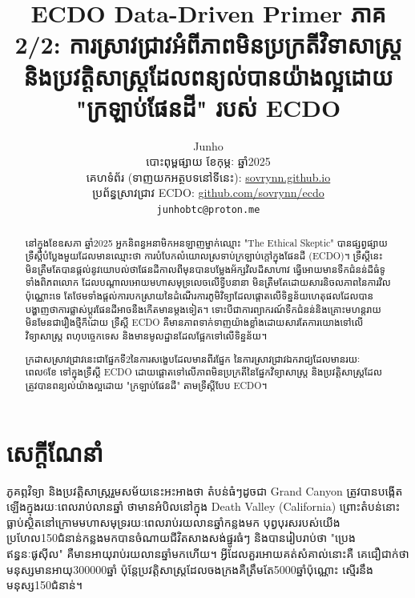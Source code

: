 \documentclass[10pt,twocolumn,letterpaper]{article}
\begin{document}
\title{ECDO Data-Driven Primer ភាគ 2/2: ការស្រាវជ្រាវអំពីភាពមិនប្រក្រតីវិទាសាស្ត្រនិងប្រវត្តិសាស្ត្រដែលពន្យល់បានយ៉ាងល្អដោយ "ក្រឡាប់ផែនដី" របស់  ECDO}

\author{Junho\\
បោះពុម្ពផ្សាយ ខែកុម្ភៈ ឆ្នាំ2025\\
គេហទំព័រ (ទាញយកអត្ថបទនៅទីនេះ): \href{https://sovrynn.github.io}{sovrynn.github.io}\\
ប្រព័ន្ធស្រាវជ្រាវ ECDO: \href{https://github.com/sovrynn/ecdo}{github.com/sovrynn/ecdo}\\
{\tt\small junhobtc@proton.me}
}

\maketitle

\begin{abstract}
នៅក្នុងខែឧសភា ឆ្នាំ2025 អ្នកនិពន្ធអនាមិកអនឡាញម្នាក់ឈ្មោះ "The Ethical Skeptic"\cite{0} បានផ្សព្វផ្សាយទ្រឹស្ដីបំប្លែងមួយដែលមានឈ្មោះថា ការបំបែកលំយោលស្រទាប់ក្រឡាប់ក្តៅក្នុងផែនដី (ECDO)\cite{1}។ ទ្រឹស្ដីនេះមិនត្រឹមតែបានផ្តល់នូវយោបល់ថាផែនដីកាលពីមុនបានបម្លែងអ័ក្សវិលដ៏សាហាវ ធ្វើអោយមានទឹកជំនន់ដ៏ធំទូទាំងពិភពលោក ដែលបណ្តាលអោយមហាសមុទ្រលេចលើទ្វីបនានា មិនត្រឹមតែដោយសារនិចលភាពនៃការវិលប៉ុណ្ណោះទេ តែថែមទាំងផ្ដល់ការបកស្រាយនៃដំណើរការភូមិវិទ្យាដែលផ្តោតលើទិន្នន័យហេតុផលដែលបានបង្ហាញថាការផ្លាស់ប្តូរផែនដីអាចនឹងកើតមានម្តងទៀត។ ទោះបីជាការព្យាករណ៍ទឹកជំនន់និងគ្រោះមហន្តរាយមិនមែនជារឿងថ្មីក៏ដោយ ទ្រឹស្ដី ECDO គឺមានភាពទាក់ទាញយ៉ាងខ្លាំងដោយសារតែការយោងទៅលើវិទ្យាសាស្ត្រ ពហុបច្ចេកទេស និងមានមូលដ្ឋានដែលផ្អែកទៅលើទិន្នន័យ។

ក្រដាសស្រាវជ្រាវនេះជាផ្នែកទី2នៃការសង្ខេបដែលមានពីរផ្នែក នៃការស្រាវជ្រាវឯករាជ្យដែលមានរយៈពេល6ខែ\cite{2,20} ទៅក្នុងទ្រឹស្ដី ECDO ដោយផ្តោតទៅលើភាពមិនប្រក្រតីនៃផ្នែកវិទ្យាសាស្ត្រ និងប្រវត្តិសាស្ត្រដែលត្រូវបានពន្យល់យ៉ាងល្អដោយ "ក្រឡាប់ផែនដី" តាមទ្រឹស្ដីបែប ECDO។

\end{abstract}

\section{សេក្តីណែនាំ}

ភូគព្ភវិទ្យា និងប្រវត្តិសាស្ត្ររួមសម័យនេះអះអាងថា តំបន់ធំៗដូចជា Grand Canyon ត្រូវបានបង្កើតឡើងក្នុងរយៈពេលរាប់លានឆ្នាំ\cite{143} ថាមានអំបិលនៅក្នុង Death Valley (California) ព្រោះតំបន់នោះធ្លាប់ស្ថិតនៅក្រោមមហាសមុទ្ររយៈពេលរាប់រយលានឆ្នាំកន្លងមក \cite{144} បុព្វបុរសរបស់យើងប្រហែល150ជំនាន់កន្លងមកបានចំណាយជីវិតសាងសង់ផ្នូរធំៗ\cite{29,70} និងបានរៀបរាប់ថា "ប្រេងឥន្ធនៈផូសុីល" គឺមានអាយុរាប់រយលានឆ្នាំមកហើយ\cite{104}។ អ្វីដែលគួរអោយគត់សំគាល់នោះគឺ គេជឿជាក់ថាមនុស្សមានអាយុ300000ឆ្នាំ\cite{145} ប៉ុន្តែប្រវត្តិសាស្ត្រដែលចងក្រងគឺត្រឹមតែ5000ឆ្នាំប៉ុណ្ណោះ ស្មើរនឹងមនុស្ស150ជំនាន់។
\end{document}
